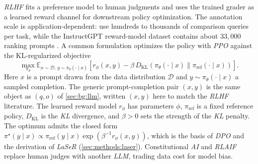 \documentclass[a4paper,oneside,10pt,english]{scrbook}
\DeclareRobustCommand{\acit}[1]{\textit{\acs{#1}}}
\DeclareRobustCommand{\acfit}[1]{\textit{\ac{#1}}}
\begin{document}
\acfit{RLHF} fits a preference model to human judgments and uses the trained grader as a learned reward channel for downstream policy optimization. The annotation scale is application-dependent: \citet{drlhumanpreferences} use hundreds to thousands of comparison queries per task, while the InstructGPT reward-model dataset contains about $33{,}000$ ranking prompts \citep{rlhf}. A common formulation optimizes the policy with \acfit{PPO} against the KL-regularized objective
\begin{equation}
	\max_{\pi_\theta} \mathbb{E}_{x \sim \mathcal{D},\, y \sim \pi_\theta(\cdot \mid x)}\!\left[r_\phi(x,y) - \beta\, D_{\mathrm{KL}}(\pi_\theta(\cdot \mid x) \| \pi_{\mathrm{ref}}(\cdot \mid x))\right].
\end{equation}
Here $x$ is a prompt drawn from the data distribution $\mathcal{D}$ and $y \sim \pi_\theta(\cdot \mid x)$ a sampled completion. The generic prompt-completion pair $(x,y)$ is the same object as $(q,o)$ of \autoref{sec:bg:llm}, written $(x,y)$ here to match the \acfit{RLHF} literature. The learned reward model $r_\phi$ has parameters $\phi$, $\pi_{\mathrm{ref}}$ is a fixed reference policy, $D_{\mathrm{KL}}$ is the \acfit{KL} divergence, and $\beta > 0$ sets the strength of the \acit{KL} penalty. The optimum admits the closed form $\pi^\star(y \mid x) \propto \pi_{\mathrm{ref}}(y \mid x) \exp(\beta^{-1} r_\phi(x,y))$, which is the basis of \acfit{DPO} \citep{directpreferenceopt} and the derivation of \acfit{LaSeR} (\autoref{sec:methods:laser}). Constitutional \acfit{AI} \citep{constitutionalai} and \acfit{RLAIF} \citep{rlaifvsrlhf} replace human judges with another \acfit{LLM}, trading data cost for model bias.
\end{document}
